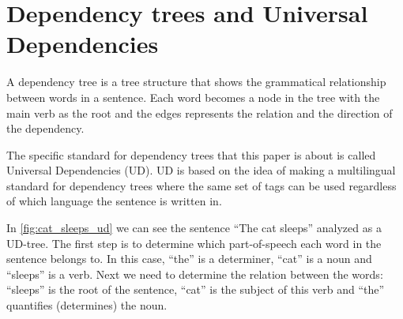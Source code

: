 



\section{Dependency trees and Universal Dependencies}
A dependency tree is a tree structure that shows the grammatical relationship between words in a sentence. Each word becomes a node in the tree with the main verb as the root and the edges represents the relation and the direction of the dependency.

The specific standard for dependency trees that this paper is about is called Universal Dependencies (UD). UD is based on the idea of making a multilingual standard for dependency trees where the same set of tags can be used regardless of which language the sentence is written in.

In \autoref{fig:cat_sleeps_ud} we can see the sentence ``The cat sleeps'' analyzed as a UD-tree. The first step is to determine which part-of-speech each word in the sentence belongs to. In this case, ``the'' is a determiner, ``cat'' is a noun and ``sleeps'' is a verb. Next we need to determine the relation between the words: ``sleeps'' is the root of the sentence, ``cat'' is the subject of this verb and ``the'' quantifies (determines) the noun.





